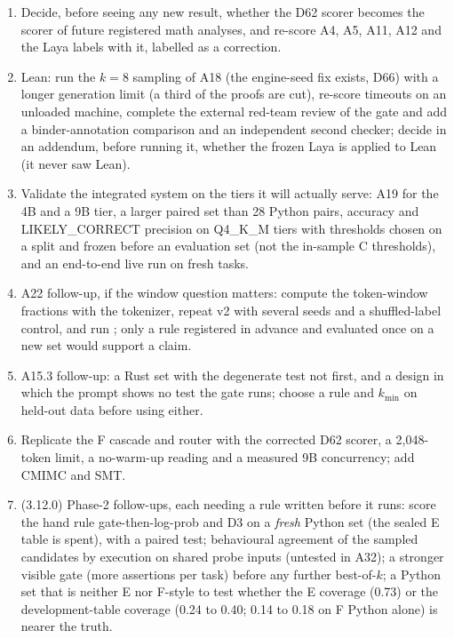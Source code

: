 \documentclass[11pt,a4paper]{article}
\newcommand{\code}[1]{\texttt{\detokenize{#1}}}
\begin{document}
\begin{enumerate}
  is implemented but evaluated only post hoc on the burned E).
\item Decide, before seeing any new result, whether the D62 scorer becomes the scorer of future registered math analyses, and re-score A4, A5, A11, A12 and the Laya labels with it, labelled as a correction.
\item Lean: run the $k=8$ sampling of A18 (the engine-seed fix exists, D66) with a longer generation limit (a third of the proofs are cut), re-score timeouts on an unloaded machine, complete the external red-team review of the gate and add a binder-annotation comparison and an independent second checker; decide in an addendum, before running it, whether the frozen Laya is applied to Lean (it never saw Lean).
\item Validate the integrated system on the tiers it will actually serve: A19 for the 4B and a 9B tier, a larger paired set than 28 Python pairs, accuracy and LIKELY\_CORRECT precision on Q4\_K\_M tiers with thresholds chosen on a split and frozen before an evaluation set (not the in-sample C thresholds), and an end-to-end live run on fresh tasks.
\item A22 follow-up, if the window question matters: compute the token-window fractions with the tokenizer, repeat v2 with several seeds and a shuffled-label control, and run \code{middle\_truncate}; only a rule registered in advance and evaluated once on a new set would support a claim.
\item A15.3 follow-up: a Rust set with the degenerate test not first, and a design in which the prompt shows no test the gate runs; choose a rule and $k_{\min}$ on held-out data before using either.
\item Replicate the F cascade and router with the corrected D62 scorer, a 2,048-token limit, a no-warm-up reading and a measured 9B concurrency; add CMIMC and SMT.
\item (3.12.0) Phase-2 follow-ups, each needing a rule written before it runs: score the hand rule gate-then-log-prob and D3 on a \emph{fresh} Python set (the sealed E table is spent), with a paired test; behavioural agreement of the sampled candidates by execution on shared probe inputs (untested in A32); a stronger visible gate (more assertions per task) before any further best-of-$k$; a Python set that is neither E nor F-style to test whether the E coverage (0.73) or the development-table coverage (0.24 to 0.40; 0.14 to 0.18 on F Python alone) is nearer the truth.

\end{enumerate}
\end{document}
